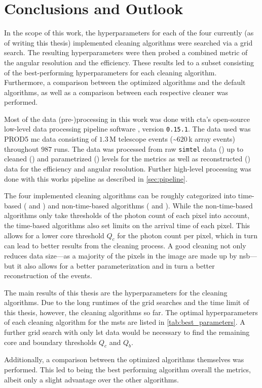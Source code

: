 \chapter{Conclusions and Outlook}
\label{ch:conclusions}

In the scope of this work, the hyperparameters for each of the four currently (as of writing this thesis)
implemented cleaning algorithms were searched via a grid search. The resulting hyperparameters were then
probed \wrt a combined metric of the angular resolution and the efficiency. These results led to a subset
consisting of the best-performing hyperparameters for each cleaning algorithm. Furthermore, a comparison between the
optimized algorithms and the default algorithms, as well as a comparison between each respective
cleaner was performed.

Most of the data (pre-)processing in this work was done with \gls{cta}'s open-source low-level data processing pipeline
software \ctapipe{}, version \texttt{0.15.1}. The data used was PROD5 \gls{mc} data consisting of
\(\num{1.3}\)\,M telescope events (\sim\(\num{620}\)\,k array events) throughout \(987\) runs. The data
was processed from raw \texttt{simtel} data (\rzero) up to cleaned (\dloa) and parametrized (\dlob) levels
for the metrics as well as reconstructed (\dlt) data for the efficiency and angular resolution.
Further high-level processing was done with this works pipeline as described in \autoref{sec:pipeline}.

The four implemented cleaning algorithms can be roughly categorized into time-based (\fact{} and \tcc) and non-time-based
algorithms (\tailcuts{} and \mars{}). While the non-time-based algorithms only take thresholds of the photon count of each pixel
into account, the time-based algorithms also set limits on the arrival time of each pixel. This allows
for a lower core threshold \(Q_c\) for the photon count per pixel, which in turn can lead to better
results from the cleaning process. A good cleaning not only reduces data size---as a majority of the
pixels in the image are made up by \gls{nsb}---but it also allows for a better parameterization and in turn
a better reconstruction of the events.

The main results of this thesis are the hyperparameters for the cleaning algorithms.
Due to the long runtimes of the grid searches and the time limit of this thesis, however, the cleaning
algorithms so far. The optimal hyperparameters of each cleaning algorithm for
the \glspl{mst} are listed in \autoref{tab:best_parameters}. A further grid search with only \gls{lst}
data would be necessary to find the remaining core and boundary thresholds \(Q_c\) and \(Q_b\).

Additionally, a comparison between the optimized algorithms themselves was performed. This led to \fact{}
being the best performing algorithm overall \wrt the metrics, albeit only a slight advantage over the
other algorithms.

